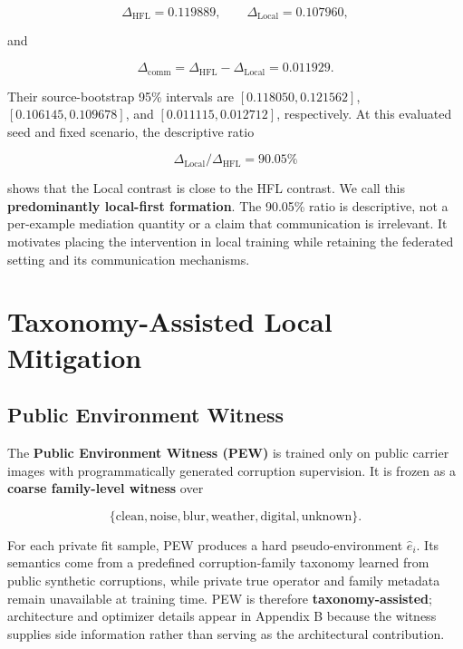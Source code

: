 \[
\Delta_{\mathrm{HFL}}=0.119889,\qquad
\Delta_{\mathrm{Local}}=0.107960,
\]

and

\[
\Delta_{\mathrm{comm}}
=\Delta_{\mathrm{HFL}}-\Delta_{\mathrm{Local}}
=0.011929.
\]

Their source-bootstrap 95\% intervals are \([0.118050,0.121562]\), \([0.106145,0.109678]\), and \([0.011115,0.012712]\), respectively. At this evaluated seed and fixed scenario, the descriptive ratio

\[
\Delta_{\mathrm{Local}}/\Delta_{\mathrm{HFL}}=90.05\%
\]

shows that the Local contrast is close to the HFL contrast. We call this \textbf{predominantly local-first formation}. The 90.05\% ratio is descriptive, not a per-example mediation quantity or a claim that communication is irrelevant. It motivates placing the intervention in local training while retaining the federated setting and its communication mechanisms.


\section{Taxonomy-Assisted Local Mitigation}

\subsection{Public Environment Witness}

The \textbf{Public Environment Witness (PEW)} is trained only on public carrier images with programmatically generated corruption supervision. It is frozen as a \textbf{coarse family-level witness} over

\[
\{\text{clean},\text{noise},\text{blur},\text{weather},\text{digital},\text{unknown}\}.
\]

For each private fit sample, PEW produces a hard pseudo-environment \(\hat e_i\). Its semantics come from a predefined corruption-family taxonomy learned from public synthetic corruptions, while private true operator and family metadata remain unavailable at training time. PEW is therefore \textbf{taxonomy-assisted}; architecture and optimizer details appear in Appendix B because the witness supplies side information rather than serving as the architectural contribution.

